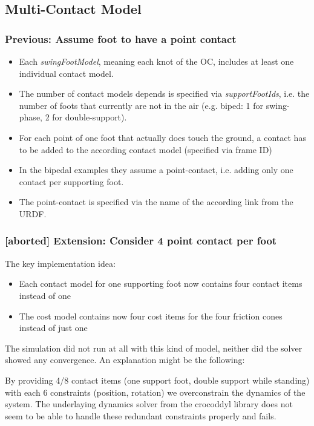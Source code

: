 \subsection{Multi-Contact Model}
\subsubsection{Previous: Assume foot to have a point contact}
\begin{itemize}
\item Each \textit{swingFootModel}, meaning each knot of the OC, includes at least one individual contact model.
\item The number of contact models depends is specified via \textit{supportFootIds}, i.e. the number of foots that currently are not in the air (e.g. biped: 1 for swing-phase, 2 for double-support).
\item For each point of one foot that actually does touch the ground, a contact has to be added to the according contact model (specified via frame ID)
\item In the bipedal examples they assume a point-contact, i.e. adding only one contact per supporting foot.
\item The point-contact is specified via the name of the according link from the URDF.
\end{itemize}
\subsubsection{[aborted] Extension: Consider 4 point contact per foot}
The key implementation idea:
\begin{itemize}
\item Each contact model for one supporting foot now contains four contact items instead of one
\item The cost model contains now four cost items for the four friction cones instead of just one 
\end{itemize}
The simulation did not run at all with this kind of model, neither did the solver showed any convergence. An explanation might be the following: 

By providing 4/8 contact items (one support foot, double support while standing) with each 6 constraints (position, rotation) we overconstrain the dynamics of the system. The underlaying dynamics solver from the crocoddyl library does not seem to be able to handle these redundant constraints properly and fails.  



